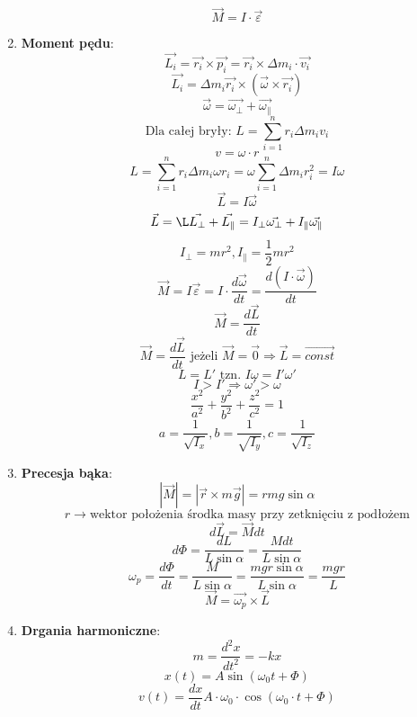 \documentclass{article}
\begin{document}
\begin{enumerate}
\[		\]
		\[
		\vec{M} = I \cdot \vec{\varepsilon}
		\]
		\item \textbf{Moment pędu}:
		\[
		\vec{L_i} = \vec{r_i} \times \vec{p_i} = \vec{r_i} \times \Delta m_i \cdot \vec{v_i}
		\]
		\[
		\vec{L_i} = \Delta m_i \vec{r_i} \times (\vec{\omega} \times \vec{r_i})
		\]
		\[
		\vec{\omega} = \vec{\omega_{\perp}} + \vec{\omega_{\parallel}}
		\]
		\[
		\text{Dla całej bryły: }
		L = \sum\limits_{i = 1}^n r_i \Delta m_i v_i
		\]
		\[
		v = \omega \cdot r
		\]
		\[
		L = \sum\limits_{i = 1}^n r_i \Delta m_i \omega r_i = \omega \sum\limits_{i = 1}^n \Delta m_i r_i^2 = I \omega
		\]
		\[
		\vec{L} = I \vec{\omega}
		\]
		\[
		\vec{L} = \L\vec{L_{\perp}} + \vec{L_{\parallel}} = I_{\perp} \vec{\omega_{\perp}} + I_{\parallel} \vec{\omega_{\parallel}}
		\]
		\[
		I_{\perp} = mr^2, I_{\parallel} = \frac{1}{2} mr^2
		\]
		\[
		\vec{M} = I \vec{\varepsilon} = I \cdot \frac{d \vec{\omega}}{dt} = \frac{d(I \cdot \vec{\omega})}{dt}
		\]
		\[
		\vec{M} = \frac{d \vec{L}}{dt}
		\]
		\[
		\vec{M} = \frac{d \vec{L}}{dt} \text{ jeżeli } \vec{M} = \vec{0} \Rightarrow \vec{L} = \overrightarrow{const}
		\]
		\[
		L = L' \text{ tzn. } I \omega = I' \omega '
		\]
		\[
		I > I' \Rightarrow \omega ' > \omega
		\]
		\[
		\frac{x^2}{a^2} + \frac{y^2}{b^2} + \frac{z^2}{c^2} = 1
		\]
		\[
		a = \frac{1}{\sqrt{I_x}}, b = \frac{1}{\sqrt{I_y}}, c = \frac{1}{\sqrt{I_z}}
		\]
		\item \textbf{Precesja bąka}:
		\[
		| \vec{M} | = | \vec{r} \times m \vec{g} | = rmg \sin \alpha
		\]
		\[
		r \longrightarrow \text{wektor położenia środka masy przy zetknięciu z podłożem}
		\]
		\[
		d \vec{L} = \vec{M} dt
		\]
		\[
		d \varPhi = \frac{dL}{L \sin\alpha} = \frac{Mdt}{L \sin \alpha}
		\]
		\[
		\omega_p = \frac{d \varPhi}{dt} = \frac{M}{L \sin \alpha} = \frac{mgr \sin \alpha}{L \sin \alpha} = \frac{mgr}{L}
		\]
		\[
		\vec{M} = \vec{\omega_p} \times \vec{L}
		\]
		\item \textbf{Drgania harmoniczne}:
		\[
		m = \frac{d^2x}{dt^2} = -kx
		\]
		\[
		x(t) = A \sin (\omega_0t + \varPhi)
		\]
		\newline
		\[
		v(t) = \frac{dx}{dt} A \cdot \omega_0 \cdot \cos(\omega_0 \cdot t + \varPhi)
		\]

\end{enumerate}
\end{document}
